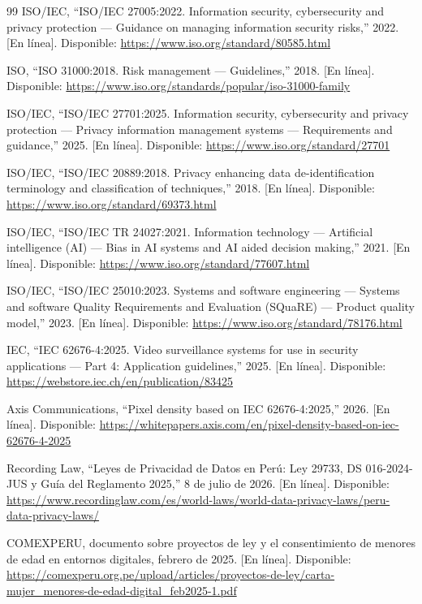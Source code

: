 \documentclass[12pt,a4paper]{article}
\begin{document}
\begin{thebibliography}{99}
ISO/IEC, ``ISO/IEC 27005:2022. Information security, cybersecurity and privacy
protection --- Guidance on managing information security risks,'' 2022. [En
línea]. Disponible: \url{https://www.iso.org/standard/80585.html}

ISO, ``ISO 31000:2018. Risk management --- Guidelines,'' 2018. [En línea].
Disponible: \url{https://www.iso.org/standards/popular/iso-31000-family}

ISO/IEC, ``ISO/IEC 27701:2025. Information security, cybersecurity and privacy
protection --- Privacy information management systems --- Requirements and
guidance,'' 2025. [En línea]. Disponible: \url{https://www.iso.org/standard/27701}

ISO/IEC, ``ISO/IEC 20889:2018. Privacy enhancing data de-identification
terminology and classification of techniques,'' 2018. [En línea]. Disponible:
\url{https://www.iso.org/standard/69373.html}

ISO/IEC, ``ISO/IEC TR 24027:2021. Information technology --- Artificial
intelligence (AI) --- Bias in AI systems and AI aided decision making,'' 2021.
[En línea]. Disponible: \url{https://www.iso.org/standard/77607.html}

ISO/IEC, ``ISO/IEC 25010:2023. Systems and software engineering --- Systems
and software Quality Requirements and Evaluation (SQuaRE) --- Product quality
model,'' 2023. [En línea]. Disponible: \url{https://www.iso.org/standard/78176.html}

IEC, ``IEC 62676-4:2025. Video surveillance systems for use in security
applications --- Part 4: Application guidelines,'' 2025. [En línea].
Disponible: \url{https://webstore.iec.ch/en/publication/83425}

Axis Communications, ``Pixel density based on IEC 62676-4:2025,'' 2026. [En
línea]. Disponible: \url{https://whitepapers.axis.com/en/pixel-density-based-on-iec-62676-4-2025}

Recording Law, ``Leyes de Privacidad de Datos en Perú: Ley 29733, DS
016-2024-JUS y Guía del Reglamento 2025,'' 8 de julio de 2026. [En línea].
Disponible:
\url{https://www.recordinglaw.com/es/world-laws/world-data-privacy-laws/peru-data-privacy-laws/}

COMEXPERU, documento sobre proyectos de ley y el consentimiento de menores de
edad en entornos digitales, febrero de 2025. [En línea]. Disponible:
\url{https://comexperu.org.pe/upload/articles/proyectos-de-ley/carta-mujer_menores-de-edad-digital_feb2025-1.pdf}


\end{thebibliography}
\end{document}
